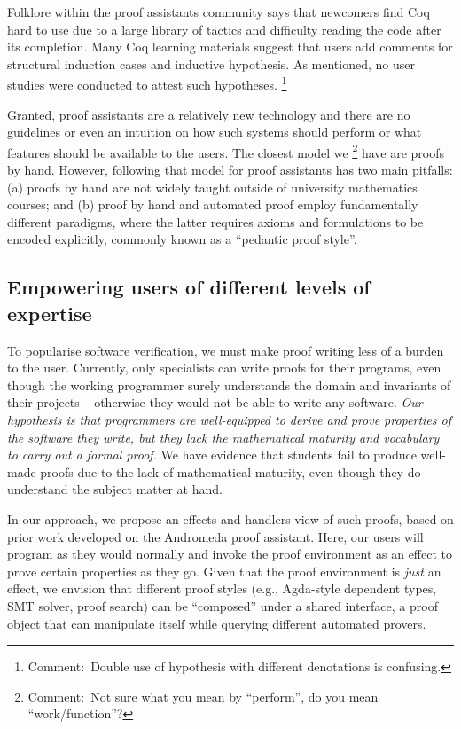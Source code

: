 \documentclass[sigconfl]{acmart}
\newcommand{\comment}[1]{\footnote{Comment:~#1}}
\begin{document}
Folklore within the proof assistants community says that newcomers
find Coq hard to use due to a large library of tactics and difficulty reading
the code after its completion. Many Coq learning materials suggest that users
add comments for structural induction cases and inductive hypothesis. As
mentioned, no user studies were conducted to attest such hypotheses.
\comment{Double use of hypothesis with different denotations is confusing.}

Granted, proof assistants are a relatively new technology
and there are no guidelines or even an intuition on how such systems should
perform or what features should be available to the users. The closest model we
\comment{Not sure what you mean by ``perform'', do you mean ``work/function''?}
have are proofs by hand. However, following that model for proof assistants has
two main pitfalls: (a) proofs by hand are not widely taught outside of
university mathematics courses; and (b) proof by hand and automated proof
employ fundamentally different paradigms, where the latter requires
axioms and formulations to be encoded explicitly, commonly known as a ``pedantic
proof style''.

\subsection{Empowering users of different levels of expertise}

To popularise software verification, we must make proof writing less of a
burden to the user. Currently, only specialists can write proofs for their
programs, even though the working programmer surely understands the domain and
invariants of their projects -- otherwise they would not be able to write any
software. \textit{Our hypothesis is that programmers are well-equipped to derive and
prove properties of the software they write, but they lack the mathematical maturity and
vocabulary to carry out a formal proof.} We have evidence that students fail to
produce well-made proofs due to the lack of mathematical maturity, even though
they do understand the subject matter at hand.

In our approach, we propose an effects and handlers view of such
proofs, based on prior work developed on the Andromeda proof assistant. Here,
our users will program as they would normally and invoke
the proof environment as an effect to prove certain properties as they go. Given
that the proof environment is \textit{just} an effect, we envision that different proof
styles (e.g., Agda-style dependent types, SMT solver, proof search) can be ``composed''
under a shared interface, a proof object that can manipulate itself while
querying different automated provers.
\end{document}
